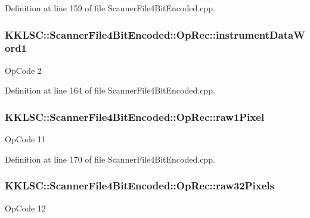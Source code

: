 Definition at line 159 of file Scanner\+File4\+Bit\+Encoded.\+cpp.

\subsubsection[{\texorpdfstring{instrument\+Data\+Word1}{instrumentDataWord1}}]{ K\+K\+L\+S\+C\+::\+Scanner\+File4\+Bit\+Encoded\+::\+Op\+Rec\+::instrument\+Data\+Word1}\hypertarget{union_scanner_file4_bit_encoded_1_1_op_rec_aeee50b40e1ed660888405fbffcb33057}{}\label{union_scanner_file4_bit_encoded_1_1_op_rec_aeee50b40e1ed660888405fbffcb33057}
Op\+Code 2 

Definition at line 164 of file Scanner\+File4\+Bit\+Encoded.\+cpp.

\subsubsection[{\texorpdfstring{raw1\+Pixel}{raw1Pixel}}]{ K\+K\+L\+S\+C\+::\+Scanner\+File4\+Bit\+Encoded\+::\+Op\+Rec\+::raw1\+Pixel}\hypertarget{union_scanner_file4_bit_encoded_1_1_op_rec_a421bca9e023482f4c28858beda4d4d9c}{}\label{union_scanner_file4_bit_encoded_1_1_op_rec_a421bca9e023482f4c28858beda4d4d9c}
Op\+Code 11 

Definition at line 170 of file Scanner\+File4\+Bit\+Encoded.\+cpp.

\subsubsection[{\texorpdfstring{raw32\+Pixels}{raw32Pixels}}]{ K\+K\+L\+S\+C\+::\+Scanner\+File4\+Bit\+Encoded\+::\+Op\+Rec\+::raw32\+Pixels}\hypertarget{union_scanner_file4_bit_encoded_1_1_op_rec_aa8c4a6bdf3892f68d4bad812de20cd32}{}\label{union_scanner_file4_bit_encoded_1_1_op_rec_aa8c4a6bdf3892f68d4bad812de20cd32}
Op\+Code 12 

